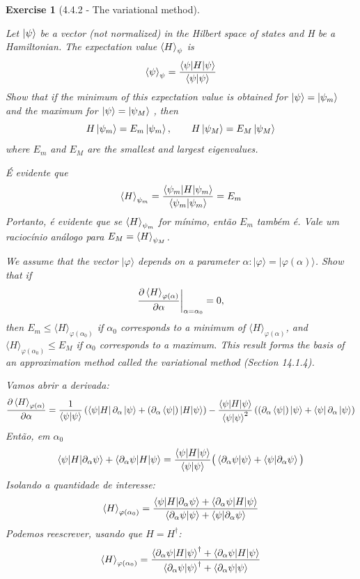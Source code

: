 \documentclass[12pt]{article}
\def\be{\begin{equation}}
\def\ee{\end{equation}}
\def\f{\frac}
\def\l{\left}
\def\r{\right}
\newtheorem{exercise}{Exercise}
\begin{document}
	\begin{exercise}[4.4.2 - The variational method]
		\begin{exercises}
			\item Let $\ket{\psi}$ be a vector (not normalized) in the Hilbert space of states and H be a Hamiltonian. The
			expectation value $\braket{H}_\psi$ is
			\be
				\braket{\psi}_\psi = \f{\braket{\psi|H|\psi}}{\braket{\psi|\psi}}
			\ee
			Show that if the minimum of this expectation value is obtained for $\ket{\psi}=\ket{\psi_m}$ and the maximum for $\ket{\psi}=\ket{\psi_M}$ , then
			\be
				H\ket{\psi_m} = E_m\ket{\psi_m}, \quad\quad H\ket{\psi_M} = E_M\ket{\psi_M}
			\ee 	
			where $E_m$ and $E_M$ are the smallest and largest eigenvalues.
			\begin{multianswer}
				É evidente que
				\be
					\braket{H}_{\psi_m} = \f{\braket{\psi_m|H|\psi_m}}{\braket{\psi_m|\psi_m}} = E_m
				\ee
				Portanto, é evidente que se $\braket{H}_{\psi_m}$ for mínimo, então $E_m$ também é. Vale um raciocínio análogo para $E_M=\braket{H}_{\psi_M}$. 		
			\end{multianswer}
	
			\item We assume that the vector $|\varphi\rangle$ depends on a parameter $\alpha:|\varphi\rangle=|\varphi(\alpha)\rangle$. Show that if
			\begin{equation}
				\frac{\partial\braket{H}_{\varphi(\alpha)}}{\partial \alpha}\bigg|_{\alpha=\alpha_0}=0,
			\end{equation}
			then $E_{m} \leq\langle H\rangle_{\varphi\left(\alpha_{0}\right)}$ if $\alpha_{0}$ corresponds to a minimum of $\langle H\rangle_{\varphi(\alpha)}$, and $\langle H\rangle_{\varphi\left(\alpha_{0}\right)} \leq E_{M}$ if $\alpha_{0}$ corresponds to a maximum. This result forms the basis of an approximation method called the variational method (Section 14.1.4).
		\begin{multianswer}
			Vamos abrir a derivada:
			\be
				\frac{\partial\braket{H}_{\varphi(\alpha)}}{\partial \alpha} = \f{1}{\braket{\psi|\psi}}\l( \bra{\psi|H} \partial_\alpha\ket{\psi} + (\partial_\alpha\bra{\psi})\ket{H|\psi}\r) - \f{\braket{\psi|H|\psi}}{\braket{\psi|\psi}^2}\l( (\partial_\alpha\bra{\psi})\ket{\psi} + \bra{\psi}\partial_\alpha\ket{\psi}\r) 
			\ee
			Então, em $\alpha_0$
			\be
				\braket{\psi|H|\partial_\alpha\psi} + \braket{\partial_\alpha\psi|H|\psi} = \f{\braket{\psi|H|\psi}}{\braket{\psi|\psi}}\big( \braket{\partial_\alpha\psi|\psi} + \braket{\psi|\partial_\alpha\psi}\big)
			\ee
			Isolando a quantidade de interesse:
			\be
				\braket{H}_{\varphi(\alpha_0)} = \f{\braket{\psi|H|\partial_\alpha\psi} + \braket{\partial_\alpha\psi|H|\psi}}{\braket{\partial_\alpha\psi|\psi} + \braket{\psi|\partial_\alpha\psi}}
			\ee 
			Podemos reescrever, usando que $H=H^\dagger$:
			\be
				\braket{H}_{\varphi(\alpha_0)} = \f{\braket{\partial_\alpha\psi|H|\psi}^\dagger + \braket{\partial_\alpha\psi|H|\psi}}{\braket{\partial_\alpha\psi|\psi}^\dagger + \braket{\partial_\alpha\psi|\psi}}
			\ee
			

\end{multianswer}
\end{exercises}
\end{exercise}
\end{document}
